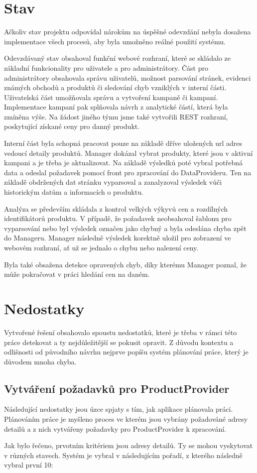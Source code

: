 \documentclass[thesis=B,czech]{FITthesis}[2012/06/26]
\begin{document}
\section{Stav}
Ačkoliv stav projektu odpovídal nárokům na úspěšné odevzdání nebyla dosažena implementace všech procesů, aby byla umožněno reálné
použití systému.
\par
Odevzdávaný stav obsahoval funkční webové rozhraní, které se skládalo ze základní funkcionality pro uživatele a pro administrátory.
Část pro administrátory obsahovala správu uživatelů, možnost parsování stránek, evidenci známých obchodů a produktů či sledování
chyb vzniklých v interní části.
Uživatelská část umožňovala správu a vytvoření kampaně či kampaní. Implementace kampaní pak splňovala návrh z analytické částí,
která byla zmíněna výše.
Na žádost jiného týmu jsme také vytvořili REST rozhraní, poskytující získané ceny pro danný produkt.
\par
Interní část byla schopná pracovat pouze na základě dříve uložených url adres vedoucí detaily produktů. 
Manager dokázal vybrat produkty, které jsou v aktivní kampani a je třeba je aktualizovat.
Na základě výsledků poté vybral potřebná data a odeslal požadavek pomocí front pro zpracování do DataProvideru. Ten na základě obdržených dat stránku vyparsoval a zanalyzoval výsledek vůči historickým datům a informacích o produktu. 
\par
Analýza se především skládala z kontrol velkých výkyvů cen a rozdílných identifikátorů produktu.
V případě, že požadavek neobsahoval šablonu pro vyparsování nebo byl výsledek označen jako chybný a byla odeslána chyba
zpět do Manageru. Manager následně výsledek korektně uložil pro zobrazení ve webovém rozhraní, ať už se jednalo o chybu
nebo nalezení ceny.
\par
Byla také obsažena detekce opravených chyb, díky kterému Manager poznal, že může pokračovat v práci hledání cen na daném.

\section{Nedostatky}
Vytvořené řešení obsahovalo spoustu nedostatků, které je třeba v rámci této práce detekovat a ty nejdůležitější se pokusit opravit.
Z důvodu kontextu a odlišnosti od původního návrhu nejprve popíšu systém plánování práce, který je důvodem mnoha chyba.

\subsection{Vytváření požadavků pro ProductProvider}
Následující nedostatky jsou úzce spjaty s tím, jak aplikace plánovala práci. Plánováním práce je myšleno proces ve kterém 
jsou vybrány požadováné adresy detailů a z nich vytvářeny požadavky pro ProductProvider k zpracování. 
\par
Jak bylo řečeno, prvotním kritériem jsou adresy detailů. Ty se mohou vyskytovat v různých stavech. Systém je vybral v 
následujícím pořadí, z kterého následně vybral první 10:
\end{document}
